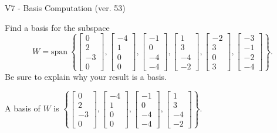 \begin{exercise}
  \begin{exerciseTitle}V7 - Basis Computation (ver. 53)\end{exerciseTitle}
  \begin{exerciseStatement}
    Find a basis for the subspace 
\[W=\mathrm{span}\ \left\{\left[\begin{array}{r}
0 \\
2 \\
-3 \\
0
\end{array}\right] , \left[\begin{array}{r}
-4 \\
1 \\
0 \\
0
\end{array}\right] , \left[\begin{array}{r}
-1 \\
0 \\
-4 \\
-4
\end{array}\right] , \left[\begin{array}{r}
1 \\
3 \\
-4 \\
-2
\end{array}\right] , \left[\begin{array}{r}
-2 \\
3 \\
0 \\
3
\end{array}\right] , \left[\begin{array}{r}
-3 \\
-1 \\
-2 \\
-4
\end{array}\right]\right\}.\]
 Be sure to explain why your result is a basis.


  \end{exerciseStatement}
  \begin{exerciseAnswer}
   A basis of \(W\) is  \(\left\{\left[\begin{array}{r}
0 \\
2 \\
-3 \\
0
\end{array}\right] , \left[\begin{array}{r}
-4 \\
1 \\
0 \\
0
\end{array}\right] , \left[\begin{array}{r}
-1 \\
0 \\
-4 \\
-4
\end{array}\right] , \left[\begin{array}{r}
1 \\
3 \\
-4 \\
-2
\end{array}\right]\right\}\).
  


  \end{exerciseAnswer}
\end{exercise}